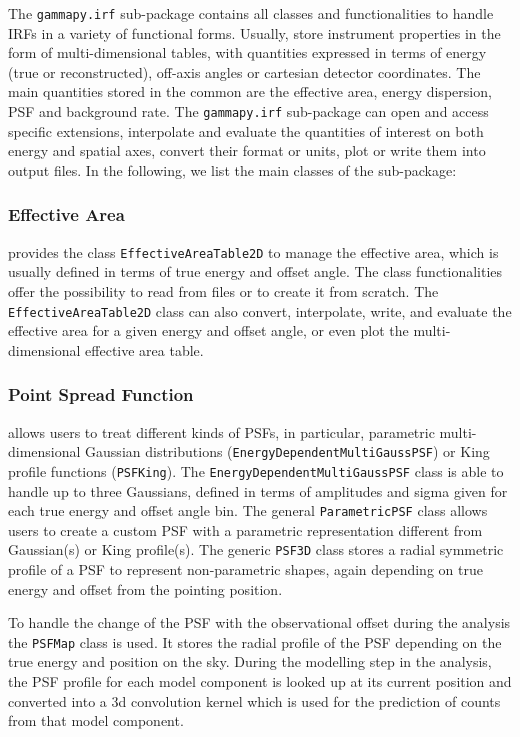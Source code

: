\documentclass[longauth]{aa}
\newcommand{\code}[1]{\texttt{#1}}
\begin{document}
The \code{gammapy.irf} sub-package contains all classes and functionalities
to handle IRFs in a variety of functional forms.
Usually, \irfs store instrument properties in the form of multi-dimensional
tables, with quantities expressed in terms of energy (true or reconstructed),
off-axis angles or cartesian detector coordinates. The main quantities stored in
the common \gammaray \irfs are the effective area, energy dispersion,
PSF and background rate. The \code{gammapy.irf}
sub-package can open and access specific \irf extensions,
interpolate and evaluate the quantities of interest on both energy and spatial
axes, convert their format or units, plot or write them into
output files. In the following, we list the main classes of the
sub-package:

\subsubsection{Effective Area}
\gammapy provides the class \code{EffectiveAreaTable2D} to
manage the effective area, which is usually defined in terms of true energy and offset angle.
The class functionalities offer the possibility to read from files or to create
it from scratch. The \code{EffectiveAreaTable2D} class can also convert, interpolate,
write, and evaluate the effective area for a given energy and offset angle, or
even plot the multi-dimensional effective area table.


\subsubsection{Point Spread Function}
\gammapy allows users to treat different kinds of PSFs,
in particular, parametric multi-dimensional Gaussian distributions (\code{EnergyDependentMultiGaussPSF})
or King profile functions (\code{PSFKing}). The \code{EnergyDependentMultiGaussPSF}
class is able to handle up to three Gaussians, defined in terms of amplitudes and sigma given for each true energy
and offset angle bin. The general \code{ParametricPSF} class allows users to create a
custom PSF with a parametric representation different from Gaussian(s) or King profile(s).
The generic \code{PSF3D} class stores a radial symmetric profile of a
PSF to represent non-parametric shapes, again depending on true energy
and offset from the pointing position.

To handle the change of the PSF with the observational offset during the analysis 
the \code{PSFMap} class is used. It stores the radial profile of the PSF
depending on the true energy and position on the sky. During the modelling
step in the analysis, the PSF profile for each model component is 
looked up at its current position and converted into a 3d convolution kernel
which is used for the prediction of counts from that model component.
\end{document}

